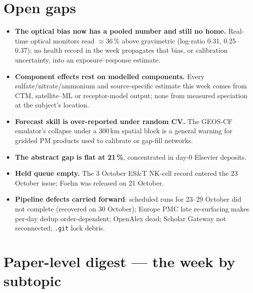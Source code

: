 \documentclass[10pt]{article}
\begin{document}
\vspace{2mm}
\section*{\sffamily\bfseries\color{Deep}Open gaps}
\vspace{-1.5mm}{\color{Teal}\rule{\linewidth}{1.1pt}}\vspace{2.5mm}

\footnotesize
\begin{itemize}
\item \textbf{The optical bias now has a pooled number and still no home.} Real-time optical monitors read
$\approx$36\,\% above gravimetric (log-ratio 0.31, 0.25--0.37); no health record in the week propagates that
bias, or calibration uncertainty, into an exposure--response estimate.

\item \textbf{Component effects rest on modelled components.} Every sulfate/nitrate/ammonium and source-specific
estimate this week comes from CTM, satellite--ML or receptor-model output; none from measured speciation at
the subject's location.

\item \textbf{Forecast skill is over-reported under random CV.} The GEOS-CF emulator's collapse under a
300\,km spatial block is a general warning for gridded PM products used to calibrate or gap-fill networks.

\item \textbf{The abstract gap is flat at 21\,\%}, concentrated in day-0 Elsevier deposits.

\item \textbf{Held queue empty.} The 3 October ES\&T NK-cell record entered the 23 October issue; Foehn was
released on 21 October.

\item \textbf{Pipeline defects carried forward}: scheduled runs for 23--29 October did not complete (recovered
on 30 October); Europe PMC late re-surfacing makes per-day dedup order-dependent; OpenAlex dead; Scholar Gateway
not reconnected; \texttt{.git} lock debris.
\end{itemize}

\clearpage

\section*{\sffamily\bfseries\color{Deep}Paper-level digest --- the week by subtopic}
\vspace{-1.5mm}{\color{Teal}\rule{\linewidth}{1.1pt}}\vspace{1mm}
\end{document}
